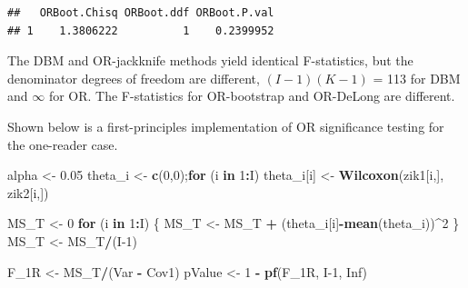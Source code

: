 \documentclass[
]{book}
\newenvironment{Shaded}{\begin{snugshade}}{\end{snugshade}}
\newcommand{\ControlFlowTok}[1]{\textcolor[rgb]{0.13,0.29,0.53}{\textbf{#1}}}
\newcommand{\DecValTok}[1]{\textcolor[rgb]{0.00,0.00,0.81}{#1}}
\newcommand{\FloatTok}[1]{\textcolor[rgb]{0.00,0.00,0.81}{#1}}
\newcommand{\KeywordTok}[1]{\textcolor[rgb]{0.13,0.29,0.53}{\textbf{#1}}}
\newcommand{\NormalTok}[1]{#1}
\newcommand{\OperatorTok}[1]{\textcolor[rgb]{0.81,0.36,0.00}{\textbf{#1}}}
\newcommand{\OtherTok}[1]{\textcolor[rgb]{0.56,0.35,0.01}{#1}}
\newcommand{\StringTok}[1]{\textcolor[rgb]{0.31,0.60,0.02}{#1}}
\begin{document}
\begin{verbatim}
##   ORBoot.Chisq ORBoot.ddf ORBoot.P.val
## 1    1.3806222          1    0.2399952
\end{verbatim}

The DBM and OR-jackknife methods yield identical F-statistics, but the denominator degrees of freedom are different, \((I-1)(K-1)\) = 113 for DBM and \(\infty\) for OR. The F-statistics for OR-bootstrap and OR-DeLong are different.

Shown below is a first-principles implementation of OR significance testing for the one-reader case.

\begin{Shaded}
\begin{Highlighting}[]
\NormalTok{alpha <-}\StringTok{ }\FloatTok{0.05}
\NormalTok{theta_i <-}\StringTok{ }\KeywordTok{c}\NormalTok{(}\DecValTok{0}\NormalTok{,}\DecValTok{0}\NormalTok{);}\ControlFlowTok{for}\NormalTok{ (i }\ControlFlowTok{in} \DecValTok{1}\OperatorTok{:}\NormalTok{I) theta_i[i] <-}\StringTok{ }\KeywordTok{Wilcoxon}\NormalTok{(zik1[i,], zik2[i,])}

\NormalTok{MS_T <-}\StringTok{ }\DecValTok{0}
\ControlFlowTok{for}\NormalTok{ (i }\ControlFlowTok{in} \DecValTok{1}\OperatorTok{:}\NormalTok{I) \{}
\NormalTok{  MS_T <-}\StringTok{ }\NormalTok{MS_T }\OperatorTok{+}\StringTok{ }\NormalTok{(theta_i[i]}\OperatorTok{-}\KeywordTok{mean}\NormalTok{(theta_i))}\OperatorTok{^}\DecValTok{2}
\NormalTok{\}}
\NormalTok{MS_T <-}\StringTok{ }\NormalTok{MS_T}\OperatorTok{/}\NormalTok{(I}\DecValTok{-1}\NormalTok{)}

\NormalTok{F_1R <-}\StringTok{ }\NormalTok{MS_T}\OperatorTok{/}\NormalTok{(Var }\OperatorTok{-}\StringTok{ }\NormalTok{Cov1)}
\NormalTok{pValue <-}\StringTok{ }\DecValTok{1} \OperatorTok{-}\StringTok{ }\KeywordTok{pf}\NormalTok{(F_1R, I}\DecValTok{-1}\NormalTok{, }\OtherTok{Inf}\NormalTok{)}


\end{Highlighting}
\end{Shaded}
\end{document}
